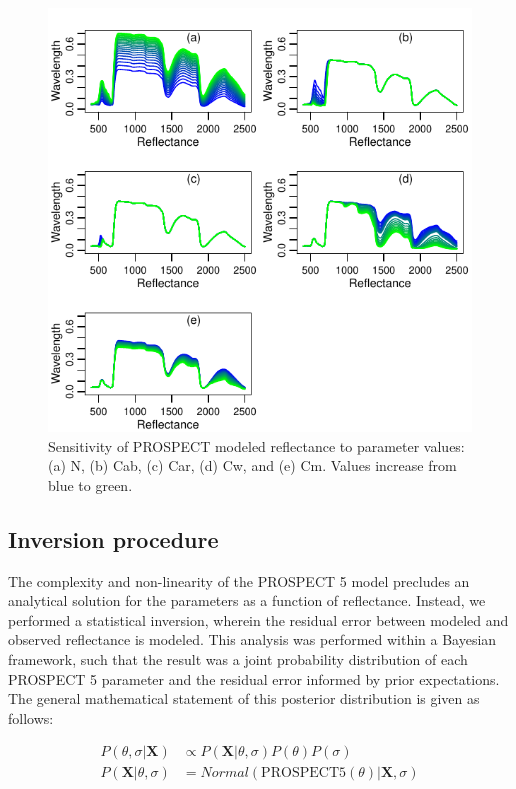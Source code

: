 \begin{figure}[h]
  \centerline{\includegraphics{figures/sensitivity}}
  \caption{
  Sensitivity of PROSPECT modeled reflectance to parameter values: (a) N, (b) 
  Cab, (c) Car, (d) Cw, and (e) Cm. Values increase from blue to green.
  }
  \label{fig:prospectsens}
\end{figure}

\subsection{Inversion procedure} \label{ss:m-inversion}

The complexity and non-linearity of the PROSPECT 5 model precludes an 
analytical solution for the parameters as a function of reflectance. Instead, 
we performed a statistical inversion, wherein the residual error between 
modeled and observed reflectance is modeled. This analysis was performed 
within a Bayesian framework, such that the result was a joint probability 
distribution of each PROSPECT 5 parameter and the residual error informed by 
prior expectations. The general mathematical statement of this posterior 
distribution is given as follows:

\begin{align}
  P(\theta, \sigma | \mathbf{X}) &\propto P(\mathbf{X} | \theta, \sigma) 
  P(\theta) P(\sigma) \\
  P(\mathbf{X} | \theta, \sigma) &= \mathit{Normal}(\mathrm{PROSPECT 5}(\theta) | \mathbf{X}, \sigma)
  \label{eq:bayes}
\end{align}

